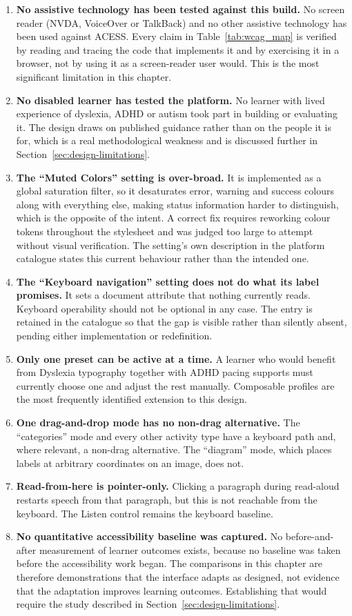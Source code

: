 \documentclass[12pt, oneside]{article} %
\begin{document}
\begin{enumerate}
    \item \textbf{No assistive technology has been tested against this build.} No screen reader (NVDA, VoiceOver or TalkBack) and no other assistive technology has been used against ACESS. Every claim in Table~\ref{tab:wcag_map} is verified by reading and tracing the code that implements it and by exercising it in a browser, not by using it as a screen-reader user would. This is the most significant limitation in this chapter.
    \item \textbf{No disabled learner has tested the platform.} No learner with lived experience of dyslexia, ADHD or autism took part in building or evaluating it. The design draws on published guidance rather than on the people it is for, which is a real methodological weakness and is discussed further in Section~\ref{sec:design-limitations}.
    \item \textbf{The ``Muted Colors'' setting is over-broad.} It is implemented as a global saturation filter, so it desaturates error, warning and success colours along with everything else, making status information harder to distinguish, which is the opposite of the intent. A correct fix requires reworking colour tokens throughout the stylesheet and was judged too large to attempt without visual verification. The setting's own description in the platform catalogue states this current behaviour rather than the intended one.
    \item \textbf{The ``Keyboard navigation'' setting does not do what its label promises.} It sets a document attribute that nothing currently reads. Keyboard operability should not be optional in any case. The entry is retained in the catalogue so that the gap is visible rather than silently absent, pending either implementation or redefinition.
    \item \textbf{Only one preset can be active at a time.} A learner who would benefit from Dyslexia typography together with ADHD pacing supports must currently choose one and adjust the rest manually. Composable profiles are the most frequently identified extension to this design.
    \item \textbf{One drag-and-drop mode has no non-drag alternative.} The ``categories'' mode and every other activity type have a keyboard path and, where relevant, a non-drag alternative. The ``diagram'' mode, which places labels at arbitrary coordinates on an image, does not.
    \item \textbf{Read-from-here is pointer-only.} Clicking a paragraph during read-aloud restarts speech from that paragraph, but this is not reachable from the keyboard. The Listen control remains the keyboard baseline.
    \item \textbf{No quantitative accessibility baseline was captured.} No before-and-after measurement of learner outcomes exists, because no baseline was taken before the accessibility work began. The comparisons in this chapter are therefore demonstrations that the interface adapts as designed, not evidence that the adaptation improves learning outcomes. Establishing that would require the study described in Section~\ref{sec:design-limitations}.
\end{enumerate}
\end{document}
